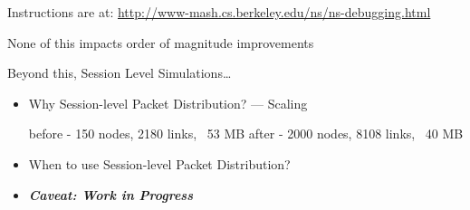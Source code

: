 \documentclass[landscape]{foils}
\begin{document}
\begin{comment}
\item top line is total memory used
\item next line ra=0x is function in shared library
\item next line us TclObject::bind-allocated-memory
\item next line are subtotals for different sizes
\item StringCreate only has one size of allocation => no subtotals
\end{comment}

Instructions are at:
\url{http://www-mash.cs.berkeley.edu/ns/ns-debugging.html}

None of this impacts order of magnitude improvements

Beyond this, Session Level Simulations\ldots

\begin{comment}
\item emphaise order or magnitude scaling is problematic
\end{comment}

\begin{itemize}
\item Why Session-level Packet Distribution? \hfil --- Scaling
\begin{program}\small
        before - 150  nodes, 2180 links, ~53 MB
        after  - 2000 nodes, 8108 links, ~40 MB
\end{program}
\item When to use Session-level Packet Distribution?
\item \emph{\textbf{Caveat:  Work in Progress}}
\end{itemize}

\begin{comment}
\item WORK IN PROGRESS
\item cost of just creating the topology
\item ensure no queueing,
\end{comment}
\end{document}
